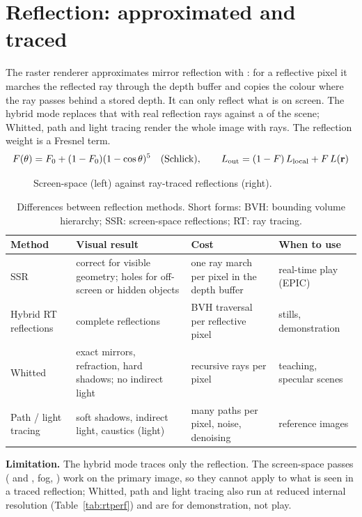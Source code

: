 \section{Reflection: approximated and traced}
\label{sec:rtadv}
The raster renderer approximates mirror reflection with : for a reflective pixel it
marches the reflected ray through the depth buffer and copies the colour where the ray passes behind a stored depth.
It can only reflect what is on screen. The hybrid mode replaces that with real reflection rays against a  of the
scene; Whitted, path and light tracing render the whole image with rays. The reflection weight is a Fresnel term.
\begin{equation}
F(\theta)=F_0+(1-F_0)(1-\cos\theta)^5\quad\text{(Schlick)},\qquad
L_{\text{out}}=(1-F)\,L_{\text{local}}+F\,L(\mathbf{r})
\label{eq:fresnel}
\end{equation}

\begin{figure}[htbp]
\centering
{}
\caption{Screen-space (left) against ray-traced reflections (right).}
\label{fig:refl}
\end{figure}


\begin{table}[htbp]
\caption{Cost of each render mode at \rtperfsize{} on the RTX 4070. Hybrid traces at full size; Whitted,
path and light tracing render at a reduced internal size and upscale.}\label{tab:rtperf}
\centering\small
\rtperftable
\end{table}

\begin{table}[htbp]
\caption{Differences between reflection methods. Short forms: BVH: bounding volume hierarchy; SSR: screen-space reflections; RT: ray tracing.}
\centering\small
\begin{tabularx}{\linewidth}{@{}lXXl@{}}
\toprule
Method & Visual result & Cost & When to use\\\midrule
SSR & correct for visible geometry; holes for off-screen or hidden objects & one ray march per pixel in the depth buffer & real-time play (EPIC)\\
Hybrid RT reflections & complete reflections & BVH traversal per reflective pixel & stills, demonstration\\
Whitted & exact mirrors, refraction, hard shadows; no indirect light & recursive rays per pixel & teaching, specular scenes\\
Path / light tracing & soft shadows, indirect light, caustics (light) & many paths per pixel, noise, denoising & reference images\\
\bottomrule
\end{tabularx}
\end{table}

\textbf{Limitation.} The hybrid mode traces only the reflection. The screen-space passes ( and , fog, ) work on the primary
image, so they cannot apply to what is seen in a traced reflection; Whitted, path and light tracing also run at reduced
internal resolution (Table~\ref{tab:rtperf}) and are for demonstration, not play.
